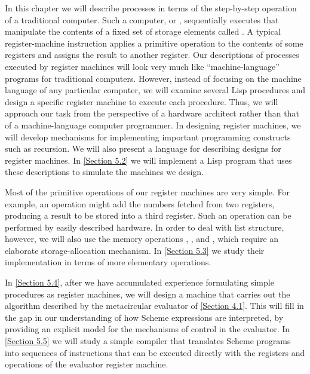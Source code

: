 In this chapter we will describe processes in terms of the step-by-step operation of a traditional computer.
Such a computer, or , sequentially executes  that manipulate the contents of a fixed set of storage elements called .
A typical register-machine instruction applies a primitive operation to the contents of some registers and assigns the result to another register.
Our descriptions of processes executed by register machines will look very much like “machine-language” programs for traditional computers.
However, instead of focusing on the machine language of any particular computer, we will examine several Lisp procedures and design a specific register machine to execute each procedure.
Thus, we will approach our task from the perspective of a hardware architect rather than that of a machine-language computer programmer.
In designing register machines, we will develop mechanisms for implementing important programming constructs such as recursion.
We will also present a language for describing designs for register machines.
In \cref{Section 5.2} we will implement a Lisp program that uses these descriptions to simulate the machines we design.

Most of the primitive operations of our register machines are very simple.
For example, an operation might add the numbers fetched from two registers, producing a result to be stored into a third register.
Such an operation can be performed by easily described hardware.
In order to deal with list structure, however, we will also use the memory operations , , and , which require an elaborate storage-allocation mechanism.
In \cref{Section 5.3} we study their implementation in terms of more elementary operations.

In \cref{Section 5.4}, after we have accumulated experience formulating simple procedures as register machines, we will design a machine that carries out the algorithm described by the metacircular evaluator of \cref{Section 4.1}.
This will fill in the gap in our understanding of how Scheme expressions are interpreted, by providing an explicit model for the mechanisms of control in the evaluator.
In \cref{Section 5.5} we will study a simple compiler that translates Scheme programs into sequences of instructions that can be executed directly with the registers and operations of the evaluator register machine.






